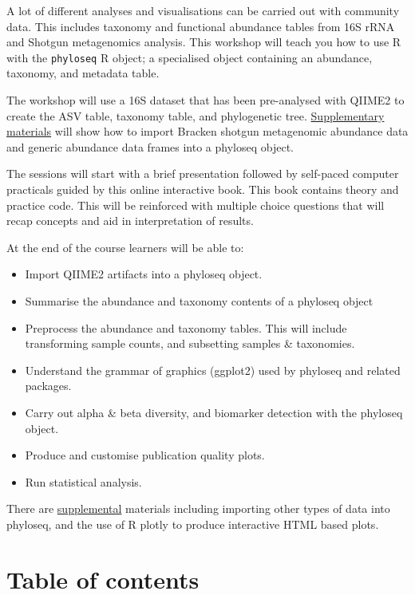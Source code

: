 \documentclass[
]{book}
\providecommand{\tightlist}{%
  \setlength{\itemsep}{0pt}\setlength{\parskip}{0pt}}
\begin{document}
A lot of different analyses and visualisations can be carried out with community data. This includes taxonomy and functional abundance tables from 16S rRNA and Shotgun metagenomics analysis. This workshop will teach you how to use R with the \texttt{phyloseq} R object; a specialised object containing an abundance, taxonomy, and metadata table.

The workshop will use a 16S dataset that has been pre-analysed with QIIME2 to create the ASV table, taxonomy table, and phylogenetic tree. \href{https://neof-workshops.github.io/R_community_whqkt8/Supplemental/}{Supplementary materials} will show how to import Bracken shotgun metagenomic abundance data and generic abundance data frames into a phyloseq object.

The sessions will start with a brief presentation followed by self-paced computer practicals guided by this online interactive book. This book contains theory and practice code. This will be reinforced with multiple choice questions that will recap concepts and aid in interpretation of results.

At the end of the course learners will be able to:

\begin{itemize}
\tightlist
\item
  Import QIIME2 artifacts into a phyloseq object.
\item
  Summarise the abundance and taxonomy contents of a phyloseq object
\item
  Preprocess the abundance and taxonomy tables. This will include transforming sample counts, and subsetting samples \& taxonomies.
\item
  Understand the grammar of graphics (ggplot2) used by phyloseq and related packages.
\item
  Carry out alpha \& beta diversity, and biomarker detection with the phyloseq object.
\item
  Produce and customise publication quality plots.
\item
  Run statistical analysis.
\end{itemize}

There are \href{https://neof-workshops.github.io/R_community_whqkt8/Supplemental/}{supplemental} materials including importing other types of data into phyloseq, and the use of R plotly to produce interactive HTML based plots.

\hypertarget{table-of-contents}{%
\section*{Table of contents}\label{table-of-contents}}
\end{document}

